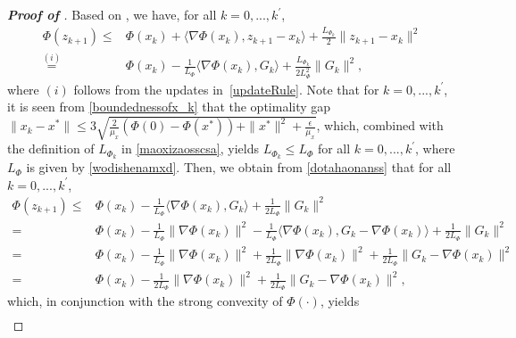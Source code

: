 \documentclass{osudissert96}
\begin{document}
\begin{proof}[{\bf Proof of }]
Based on , we have, for all $k=0,...,k^\prime$,  
\begin{align}\label{dotahaonanss}
\Phi(z_{k+1})\leq& \Phi(x_k)+\langle \nabla \Phi(x_k),z_{k+1}-x_k\rangle +  \frac{L_{\Phi_k}}{2}\|z_{k+1}-x_k\|^2 \nonumber
\\\overset{(i)}=& \Phi(x_k)-\frac{1}{L_\Phi}\langle \nabla \Phi(x_k),G_k\rangle +  \frac{L_{\Phi_k}}{2L_\Phi^2}\|G_k\|^2,  
\end{align}
 where $(i)$ follows from the updates in~\cref{updateRule}. Note that for $k=0,...,k^\prime$, it is seen from \cref{boundednessofx_k} that the optimality gap  $\|x_k-x^*\|\leq 3\sqrt{\frac{2}{\mu_x}(\Phi(0) -\Phi(x^*))+ \|x^*\|^2+\frac{\epsilon}{\mu_x}}$, which, combined with the definition of $L_{\Phi_k}$ in \cref{maoxizaosscsa}, 
 yields $L_{\Phi_k} \leq L_\Phi$ for all $k=0,...,k^\prime$, where $L_\Phi$ is given by \cref{wodishenamxd}. Then, we obtain from \cref{dotahaonanss} that for all $k=0,...,k^\prime$, 
 \begin{align}\label{mxdhuaqingduo}
 \Phi(z_{k+1})\leq& \Phi(x_k)-\frac{1}{L_\Phi}\langle \nabla \Phi(x_k),G_k\rangle +  \frac{1}{2L_\Phi}\|G_k\|^2 \nonumber
 \\=& \Phi(x_k)-\frac{1}{L_\Phi}\| \nabla \Phi(x_k)\|^2 - \frac{1}{L_\Phi} \langle \nabla \Phi(x_k),G_k- \nabla \Phi(x_k)\rangle +  \frac{1}{2L_\Phi}\|G_k\|^2 \nonumber
 \\=& \Phi(x_k)-\frac{1}{L_\Phi}\| \nabla \Phi(x_k)\|^2 + \frac{1}{2L_\Phi} \|\nabla \Phi(x_k)\|^2 +  \frac{1}{2L_\Phi} \|G_k-\nabla \Phi(x_k)\|^2 \nonumber
 \\=& \Phi(x_k)-\frac{1}{2L_\Phi}\| \nabla \Phi(x_k)\|^2 +  \frac{1}{2L_\Phi} \|G_k-\nabla \Phi(x_k)\|^2,
 \end{align}
 which, in conjunction with the strong convexity of $\Phi(\cdot)$,  yields
 \begin{align}\label{wodialayacs}

\end{align}
\end{proof}
\end{document}
